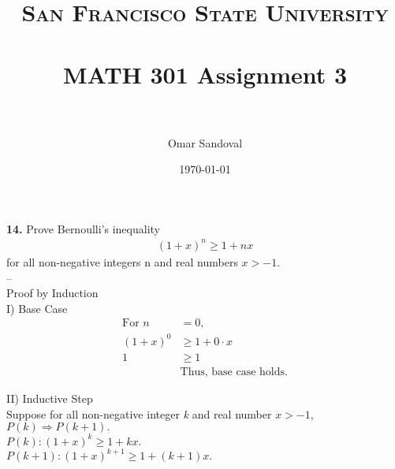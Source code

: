 \documentclass[paper=letter, fontsize=11pt]{scrartcl} %
\title{	
\normalfont \normalsize 
\textsc{San Francisco State University} \\ [25pt]
\horrule{0.5pt} \\[0.4cm] %
\huge MATH 301 Assignment 3  \\ %
\horrule{2pt} \\[0.5cm] %
}
\author{Omar Sandoval}
\date{\normalsize\today}
\begin{document}
\maketitle
\textbf{14.} Prove Bernoulli's inequality
\begin{align*}
	(1+x)^n \ge 1 + nx
\end{align*}
for all non-negative integers n and real numbers $x > -1$. \\
--\\
Proof by Induction\\
I) Base Case \\
\begin{align*}
	\text{For } n &= 0, \\
	(1 + x)^0 &\ge 1 + 0 \cdot x \\
	1 &\ge 1 \\
	&\text{Thus, base case holds.} 
\end{align*}

II) Inductive Step \\
Suppose for all non-negative integer \textit{k} and real number $x > -1$, $P(k) \Rightarrow P(k+1).$ \\
$P(k): (1 + x)^k \ge 1 + kx.$ \\
$P(k+1): (1 + x)^{k+1} \ge 1 + (k + 1)x.$ \\
\end{document}

